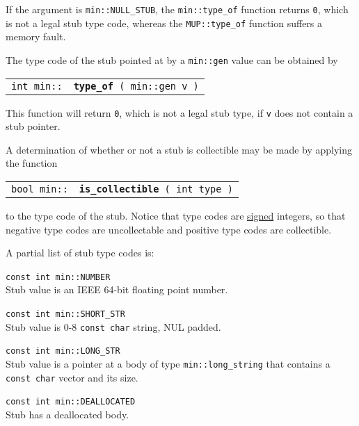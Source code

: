 \documentclass[12pt]{article}
\makeatletter
\newcommand{\ttindex}[1]{\index{#1@{\tt #1}}}
\newcommand{\minindex}[1]{\ttindex{min::#1}\ttindex{#1}}
\newcommand{\EOL}{\penalty \exhyphenpenalty}
\newenvironment{indpar}[1][0.3in]%
	{\begin{list}{}%
		     {\setlength{\itemsep}{0in}%
		      \setlength{\topsep}{0in}%
		      \setlength{\parsep}{1ex}%
		      \setlength{\labelwidth}{#1}%
		      \setlength{\leftmargin}{#1}%
		      \addtolength{\leftmargin}{\labelsep}}%
	 \item}%
	{\end{list}}
\newcommand{\LABEL}[1]{\label{#1}}
\newcommand{\MINKEY}[1]{{\tt \bf #1}\minindex{#1}}
\makeatother
\begin{document}
If the argument is {\tt min::NULL\_STUB},
the {\tt min::type\_of} function returns {\tt 0}, which is not
a legal stub type code,
whereas the {\tt MUP::\EOL type\_\EOL of} function suffers a memory fault.

The type code of the stub pointed at by a {\tt min::gen} value
can be obtained by

\begin{indpar}\begin{tabular}{r@{}l}
\verb|int min::| & \MINKEY{type\_of}\verb| ( min::gen v )|
\LABEL{MIN::TYPE_OF_GEN}
\end{tabular}\end{indpar}

This function will return {\tt 0}, which is not a legal stub type,
if {\tt v} does not contain a stub pointer.

A determination of whether or not a stub is collectible may be made
by applying the function

\begin{indpar}\begin{tabular}{r@{}l}
\verb|bool min::| & \MINKEY{is\_collectible}\verb| ( int type )|
\LABEL{MIN::IS_COLLECTIBLE}
\end{tabular}\end{indpar}

to the type code of the stub.  Notice that type codes are \underline{signed}
integers, so that negative type codes are uncollectable and positive type codes
are collectible.

A partial list of stub type codes is:

\begin{indpar}
\begin{list}{}{}
\item[{\tt const int min::NUMBER}]~\\
Stub value is an IEEE 64-bit floating point number.
\item[{\tt const int min::SHORT\_STR}]~\\
Stub value is 0-8 \verb|const char| string, NUL padded.
\item[{\tt const int min::LONG\_STR}]~\\
Stub value is a pointer at a body of type {\tt min::long\_\EOL string}
that contains a \verb|const char| vector and its size. 
\item[{\tt const int min::DEALLOCATED}]~\\
Stub has a deallocated body.
\end{list}
\end{indpar}
\end{document}
